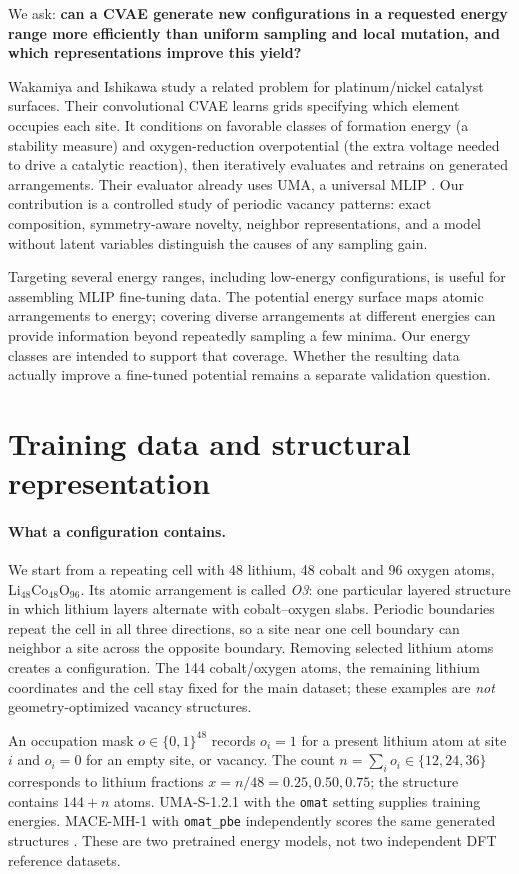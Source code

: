 \documentclass{article}
\begin{document}
We ask: \textbf{can a CVAE generate new configurations in a requested energy
range more efficiently than uniform sampling and local mutation, and which
representations improve this yield?}

Wakamiya and Ishikawa
\citep{wakamiya2026} study a related problem for platinum/nickel catalyst
surfaces. Their convolutional CVAE learns grids specifying which element
occupies each site. It conditions on favorable classes of formation energy
(a stability measure) and oxygen-reduction overpotential (the extra voltage
needed to drive a catalytic reaction), then iteratively evaluates and retrains
on generated arrangements. Their evaluator already uses UMA, a universal MLIP
\citep{uma2025}. Our contribution is a controlled study of periodic vacancy
patterns: exact composition, symmetry-aware novelty, neighbor representations,
and a model without latent variables distinguish the causes of any sampling gain.

Targeting several energy ranges, including low-energy configurations, is useful
for assembling MLIP fine-tuning data. The potential energy surface maps atomic
arrangements to energy; covering diverse arrangements at different energies can
provide information beyond repeatedly sampling a few minima. Our energy classes
are intended to support that coverage. Whether the resulting data actually
improve a fine-tuned potential remains a separate validation question.

\section{Training data and structural representation}
\paragraph{What a configuration contains.}
We start from a repeating cell with 48 lithium, 48 cobalt and 96 oxygen atoms,
Li$_{48}$Co$_{48}$O$_{96}$. Its atomic arrangement is called \emph{O3}: one
particular layered structure in which lithium layers alternate with cobalt--oxygen
slabs. Periodic boundaries repeat the cell in all three directions, so a site
near one cell boundary can neighbor a site across the opposite boundary.
Removing selected lithium atoms creates a configuration. The 144 cobalt/oxygen
atoms, the remaining lithium coordinates and the cell stay fixed for the main
dataset; these examples are \emph{not} geometry-optimized vacancy structures.

An occupation mask $o\in\{0,1\}^{48}$ records $o_i=1$ for a present lithium atom
at site $i$ and $o_i=0$ for an empty site, or vacancy. The count
$n=\sum_i o_i\in\{12,24,36\}$ corresponds to lithium fractions
$x=n/48=0.25,0.50,0.75$; the structure contains $144+n$ atoms. UMA-S-1.2.1
with the \texttt{omat} setting supplies training energies. MACE-MH-1 with
\texttt{omat\_pbe} independently scores the same generated structures
\citep{uma2025,mace2022}. These are two pretrained energy models, not two
independent DFT reference datasets.
\end{document}
